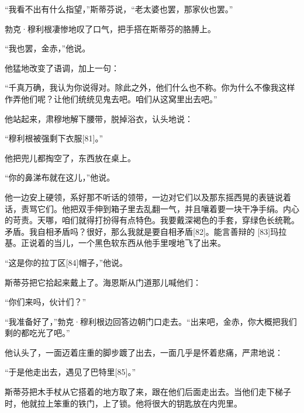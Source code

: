 \documentclass{article}
\begin{document}
“我看不出有什么指望，”斯蒂芬说，“老太婆也罢，那家伙也罢。”



勃克·穆利根凄惨地叹了口气，把手搭在斯蒂芬的胳膊上。



“我也罢，金赤，”他说。



他猛地改变了语调，加上一句：



“千真万确，我认为你说得对。除此之外，他们什么也不称。你为什么不像我这样作弄他们呢？让他们统统见鬼去吧。咱们从这窝里出去吧。”



他站起来，肃穆地解下腰带，脱掉浴衣，认头地说：



“穆利根被强剩下衣服[81]。”



他把兜儿都掏空了，东西放在桌上。



“你的鼻涕布就在这儿，”他说。



他一边安上硬领，系好那不听话的领带，一边对它们以及那东摇西晃的表链说着话，责骂它们。他把双手伸到箱子里去乱翻一气，并且嚷着要一块干净手绢。内心的苛责。天哪，咱们就得打扮得有点特色。我要戴深褐色的手套，穿绿色长统靴。矛盾。我自相矛盾吗？很好，那么我就是要自相矛盾[82]。能言善辩的 [83]玛拉基。正说着的当儿，一个黑色软东西从他手里嗖地飞了出来。



“这是你的拉丁区[84]帽子，”他说。



斯蒂芬把它拾起来戴上了。海恩斯从门道那儿喊他们：



“你们来吗，伙计们？”



“我准备好了，”勃克·穆利根边回答边朝门口走去。“出来吧，金赤，你大概把我们剩的都吃光了吧。”



他认头了，一面迈着庄重的脚步踱了出去，一面几乎是怀着悲痛，严肃地说：



“于是他走出去，遇见了巴特里[85]。”



斯蒂芬把木手杖从它搭着的地方取了来，跟在他们后面走出去。当他们走下梯子时，他就拉上笨重的铁门，上了锁。他将很大的钥匙放在内兜里。
\end{document}
